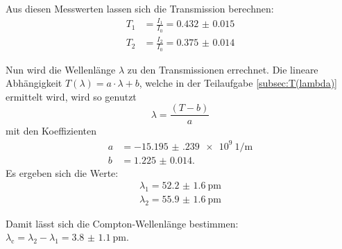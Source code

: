   \noindent Aus diesen Messwerten lassen sich die Transmission berechnen:
  \begin{align*}
    T_1 &= \frac{I_1}{I_0} = \num{0.432(15)}\\
    T_2 &= \frac{I_2}{I_0} = \num{0.375(14)}
  \end{align*}

  \noindent Nun wird die Wellenlänge $\lambda$ zu den Transmissionen errechnet. Die lineare Abhängigkeit $T(\lambda) = a \cdot \lambda + b $, 
  welche in der Teilaufgabe \ref{subsec:T(lambda)} ermittelt wird, wird so genutzt
  \begin{equation*}
    \lambda = \frac{(T - b)}{a}
  \end{equation*}
  mit den Koeffizienten
  \begin{align*}
    a &= \SI{-15.195(239)e9}{1\per\metre}\\
    b &= \num{1.225(14)}.
  \end{align*}
  Es ergeben sich die Werte:
  \begin{align*}
    \lambda_1 = \SI{52.2(16)}{\pico\metre}\\
    \lambda_2 = \SI{55.9(16)}{\pico\metre}
  \end{align*}

  \noindent Damit lässt sich die Compton-Wellenlänge bestimmen: $\lambda_{\text{c}} = \lambda_2 - \lambda_1 = \SI{3.8(11)}{\pico\metre}$. 



